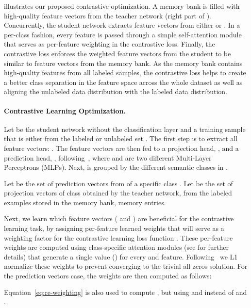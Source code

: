 \documentclass[10pt,twocolumn,letterpaper]{article}
\begin{document}
 illustrates our proposed contrastive optimization. A memory bank is filled with high-quality feature vectors from the teacher network  (right part of ). Concurrently, the student network  extracts feature vectors from either  or . In a per-class fashion, every feature is passed through a simple self-attention module that serves as per-feature weighting in the contrastive loss. Finally, the contrastive loss enforces the weighted feature vectors from the student to be similar to feature vectors from the memory bank. 
As the memory bank contains high-quality features from all labeled samples, the contrastive loss helps to create a better class separation in the feature space across the whole dataset as well as aligning the unlabeled data distribution with the labeled data distribution. 

\paragraph{Contrastive Learning Optimization.}
Let  be the student network without the classification layer and  a training sample that is either from the labeled  or unlabeled set . The first step is to extract all feature vectors: . The feature vectors  are then fed to a projection head, , and a prediction head, , following~\cite{grill2020bootstrap}, where  and  are two different Multi-Layer Perceptrons (MLPs).
Next,  is grouped by the different semantic classes in . 

Let  be the set of prediction vectors from  of a specific class . Let  be the set of projection vectors of class  obtained by the teacher network,  from the labeled examples stored in the memory bank, \ie memory entries. 
 

Next, we learn which feature vectors ( and ) are beneficial for the contrastive learning task, by assigning per-feature learned weights  that will serve as a weighting factor  for the contrastive learning loss function .
These per-feature weights are computed using class-specific attention modules  (see  for further details) that generate a single value () for every  and  feature. 
Following~\cite{sun2020learning} we L1 normalize these weights to prevent converging to the trivial all-zeros solution. For the prediction vectors  case, the weights  are then computed as follows: 

Equation~\ref{eq:re-weighting} 
is also used to compute , but using  and  instead of  and . 
\end{document}
